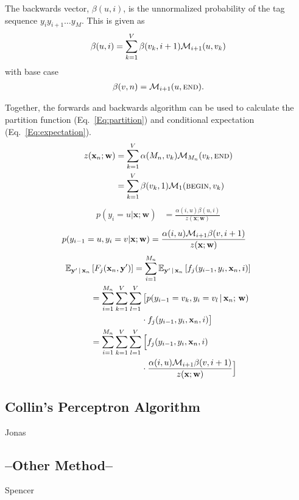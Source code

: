 \documentclass[10pt,twocolumn,letterpaper]{article}
\newcommand{\x}{\mathbf{x}}
\newcommand{\y}{\mathbf{y}}
\newcommand{\w}{\mathbf{w}}
\begin{document}
The backwards vector, $\beta(u,i)$, is the unnormalized probability of the tag sequence $y_i y_{i+1}\dots y_{M}$.  This is given as
\begin{align}
	\beta(u,i) = \sum_{k=1}^V \beta(v_k,i+1)\mathcal{M}_{i+1}(u,v_k)
\end{align}
with base case
\begin{align}
	\beta(v,n) = \mathcal{M}_{i+1}(u,\mbox{\textsc{end}}).
\end{align}

Together, the forwards and backwards algorithm can be used to calculate the partition function (Eq.\ \ref{Eq:partition}) and conditional expectation (Eq.\ \ref{Eq:expectation}).
\begin{align}
	z(\x_n;\w) &= \sum_{k=1}^V \alpha(M_n, v_k) \M_{M_n}(v_k,\mbox{\textsc{end}}) \\
	&= \sum_{k=1}^V \beta(v_k, 1)  \M_1(\mbox{\textsc{begin}}, v_k)
\end{align}
\begin{align}
	p(y_i = u | \x; \w) &= \frac{\alpha(i,u)\beta(u,i)}{z(\x;\w)}
\end{align}
\begin{align}
	p(y_{i-1}=u,y_i=v|\x;\w) &= \frac{\alpha(i,u)\M_{i+1}\beta(v,i+1)}{z(\x;\w)}
\end{align}
\begin{align}
	\mathbb{E}_{\y'\,|\,\x_n} & \left[ F_j(\x_n, \y' ) \right] 
		= \sum_{i=1}^{M_n} \mathbb{E}_{\y'\,|\,\x_n} \left[f_j(y_{i-1},y_i,\x_n, i ) \right] \\
		&= \sum_{i=1}^{M_n} \sum_{k=1}^V \sum_{l=1}^V \big[ p(y_{i-1}=v_k,y_i=v_l\,|\,\x_n ;\,\w) \notag \\
		& \hspace{6 em} \cdot f_j(y_{i-1},y_i,\x_n, i ) \big] \\
		&= \sum_{i=1}^{M_n} \sum_{k=1}^V \sum_{l=1}^V \Big[ f_j(y_{i-1},y_i,\x_n, i ) \notag \\
		& \hspace{6 em} \cdot  \frac{\alpha(i,u)\M_{i+1}\beta(v,i+1)}{z(\x;\w)} \Big]
\end{align}

\subsection{Collin's Perceptron Algorithm}
Jonas
\subsection{--Other Method--}
Spencer
\end{document}
